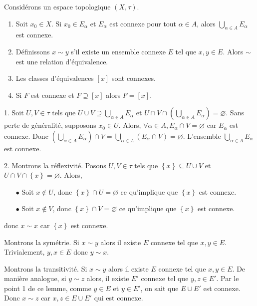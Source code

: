 \documentclass[french]{article}
\begin{document}
\begin{lemme}
  Considérons un espace topologique $(X, \tau)$.
  \begin{enumerate}
    \item Soit $x_0 \in  X$. Si $x_0 \in E_\alpha$ et $E_\alpha$ est connexe pour tout $\alpha \in A$, alors $\bigcup\limits_{\alpha \in A} E_\alpha$ est connexe.
    \item Définissons $x \sim y$ s'il existe un ensemble connexe $E$ tel que  $x, y \in E$. Alors $\sim$ est une relation d'équivalence.
    \item Les classes d'équivalences $[x]$ sont connexes.
    \item Si $F$ est connexe et $F \supseteq [x]$ alors $F = [x]$.
  \end{enumerate}

  \tcblower
  \begin{preuve}
    1. Soit $U, V \in \tau$ tels que $U \cup V \supseteq \bigcup\limits_{\alpha \in A} E_\alpha$ et $U \cap V \cap \left( \bigcup\limits_{\alpha \in A} E_\alpha \right) = \varnothing$. Sans perte de généralité, supposons $x_0 \in U$. Alors, $\forall  \alpha \in A, E_\alpha \cap V = \varnothing $ car $E_\alpha$ est connexe. Donc $\left( \bigcup\limits_{\alpha \in A} E_\alpha \right) \cap V = \bigcup\limits_{\alpha \in A} (E_\alpha \cap V) = \varnothing$. L'ensemble $\bigcup\limits_{\alpha \in A}E_\alpha$ est connexe.
    \par 2. Montrons la réflexivité. Posons $U, V \in \tau$ tels que $\left\{ x \right\} \subseteq U \cup V$ et $U \cap V \cap \left\{ x \right\} = \varnothing$. Alors,
    \begin{itemize}
      \item[$\bullet$] Soit $x \not \in U$, donc $\left\{ x \right\} \cap U = \varnothing$ ce qu'implique que $\left\{ x \right\}$ est connexe.
      \item[$\bullet$] Soit $x \not \in V$, donc $\left\{ x \right\} \cap V = \varnothing$ ce qu'implique que $\left\{ x \right\}$ est connexe.
    \end{itemize}
    donc $x \sim x$ car $\left\{ x \right\}$ est connexe.
    \par Montrons la symétrie. Si $x \sim y$ alors il existe $E$ connexe tel que $x, y \in E$. Trivialement, $y, x \in E$ donc $y \sim x$.
    \par Montrons la transitivité. Si $x \sim y$ alors il existe $E$ connexe tel que $x, y \in E$. De manière analogue, si $y \sim z$ alors, il existe $E'$ connexe tel que $y, z \in E'$. Par le point 1 de ce lemme, comme $y \in E$ et $y \in E'$, on sait que $E \cup  E'$ est connexe. Donc $x \sim z$ car $x, z \in E\cup E'$ qui est connexe.

\end{preuve}
\end{lemme}
\end{document}
